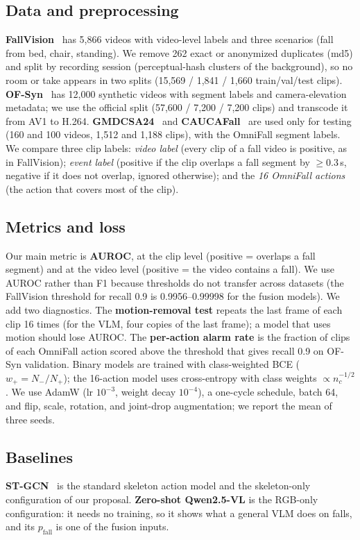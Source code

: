 \subsection{Data and preprocessing}
\textbf{FallVision}~\citep{rahman2025fallvision} has 5,866 videos with video-level labels and three scenarios (fall from bed, chair, standing).
We remove 262 exact or anonymized duplicates (md5) and split by recording session (perceptual-hash clusters of the background), so no room or take appears in two splits (15,569 / 1,841 / 1,660 train/val/test clips).
\textbf{OF-Syn}~\citep{schneider2025omnifall} has 12,000 synthetic videos with segment labels and camera-elevation metadata; we use the official split (57,600 / 7,200 / 7,200 clips) and transcode it from AV1 to H.264.
\textbf{GMDCSA24}~\citep{alam2024gmdcsa} and \textbf{CAUCAFall}~\citep{eraso2022caucafall} are used only for testing (160 and 100 videos, 1,512 and 1,188 clips), with the OmniFall segment labels.
We compare three clip labels:
\emph{video label} (every clip of a fall video is positive, as in FallVision);
\emph{event label} (positive if the clip overlaps a fall segment by $\geq$0.3\,s, negative if it does not overlap, ignored otherwise);
and the \emph{16 OmniFall actions} (the action that covers most of the clip).


\subsection{Metrics and loss}
Our main metric is \textbf{AUROC}, at the clip level (positive = overlaps a fall segment) and at the video level (positive = the video contains a fall).
We use AUROC rather than F1 because thresholds do not transfer across datasets (the FallVision threshold for recall 0.9 is 0.9956--0.99998 for the fusion models).
We add two diagnostics.
The \textbf{motion-removal test} repeats the last frame of each clip 16 times (for the VLM, four copies of the last frame); a model that uses motion should lose AUROC.
The \textbf{per-action alarm rate} is the fraction of clips of each OmniFall action scored above the threshold that gives recall 0.9 on OF-Syn validation.
Binary models are trained with class-weighted BCE ($w_+ = N_-/N_+$); the 16-action model uses cross-entropy with class weights $\propto n_c^{-1/2}$.
We use AdamW (lr $10^{-3}$, weight decay $10^{-4}$), a one-cycle schedule, batch 64, and flip, scale, rotation, and joint-drop augmentation; we report the mean of three seeds.

\subsection{Baselines}
\textbf{ST-GCN}~\citep{yan2018stgcn} is the standard skeleton action model and the skeleton-only configuration of our proposal.
\textbf{Zero-shot Qwen2.5-VL} is the RGB-only configuration: it needs no training, so it shows what a general VLM does on falls, and its $p_\mathrm{fall}$ is one of the fusion inputs.


